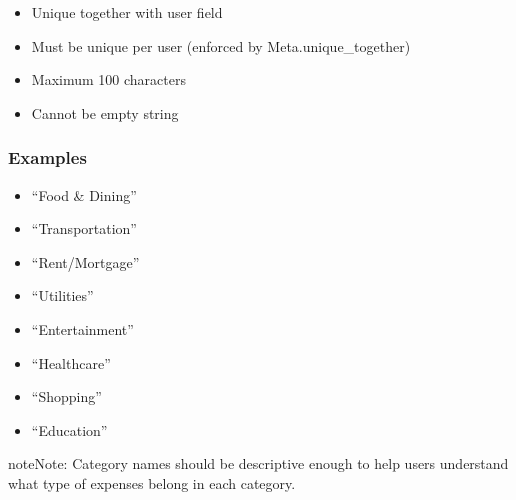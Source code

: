 \documentclass[letterpaper,10pt,english]{sphinxmanual}
\begin{document}
\begin{fulllineitems}
\begin{fulllineitems}
\begin{description}
\begin{itemize}
\item {} 
\sphinxAtStartPar
Unique together with user field

\end{itemize}

\begin{itemize}
\item {} 
\sphinxAtStartPar
Must be unique per user (enforced by Meta.unique\_together)

\item {} 
\sphinxAtStartPar
Maximum 100 characters

\item {} 
\sphinxAtStartPar
Cannot be empty string

\end{itemize}

\end{description}
\subsubsection*{Examples}
\begin{itemize}
\item {} 
\sphinxAtStartPar
“Food \& Dining”

\item {} 
\sphinxAtStartPar
“Transportation”

\item {} 
\sphinxAtStartPar
“Rent/Mortgage”

\item {} 
\sphinxAtStartPar
“Utilities”

\item {} 
\sphinxAtStartPar
“Entertainment”

\item {} 
\sphinxAtStartPar
“Healthcare”

\item {} 
\sphinxAtStartPar
“Shopping”

\item {} 
\sphinxAtStartPar
“Education”

\end{itemize}

\begin{sphinxadmonition}{note}{Note:}
\sphinxAtStartPar
Category names should be descriptive enough to help users
understand what type of expenses belong in each category.
\end{sphinxadmonition}

\end{fulllineitems}


\end{fulllineitems}
\end{document}
